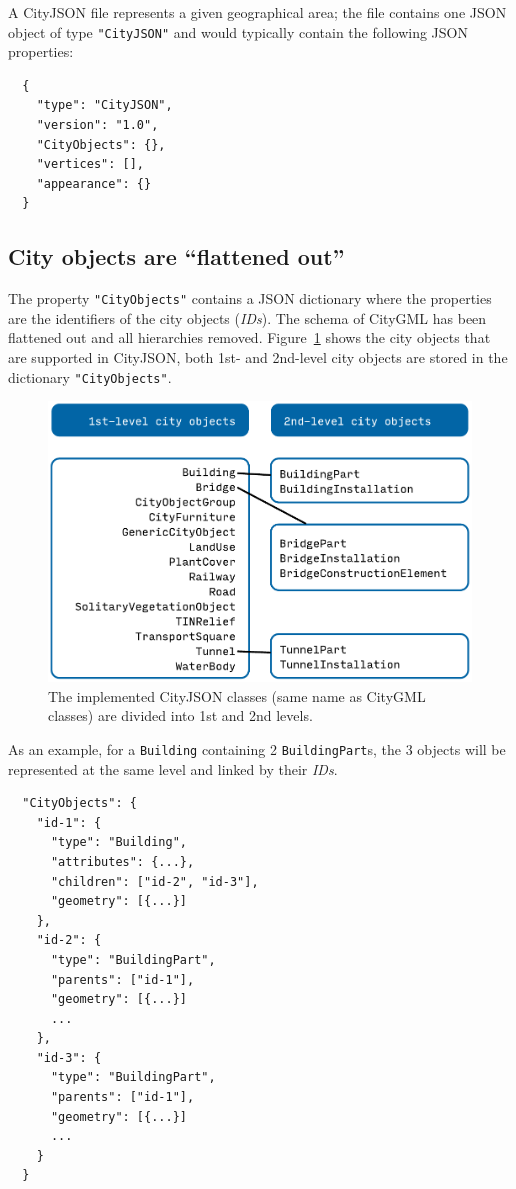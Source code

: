 %

A CityJSON file represents a given geographical area; the file contains one JSON object of type \texttt{"CityJSON"} and would typically contain the following JSON properties:
\begin{lstlisting}
  {
    "type": "CityJSON",
    "version": "1.0",
    "CityObjects": {},
    "vertices": [],
    "appearance": {}
  }
\end{lstlisting}


\subsection{City objects are ``flattened out''}

The property \texttt{"CityObjects"} contains a JSON dictionary where the properties are the identifiers of the city objects (\emph{IDs}).
The schema of CityGML has been flattened out and all hierarchies removed.
Figure~\ref{fig:cityjson_co} shows the city objects that are supported in CityJSON, both 1st- and 2nd-level city objects are stored in the dictionary \texttt{"CityObjects"}.
\begin{figure}
  \centering
  \includegraphics[width=0.6\linewidth]{figs/cityjson_co}
  \caption{The implemented CityJSON classes (same name as CityGML classes) are divided into 1st and 2nd levels.}
\label{fig:cityjson_co}
\end{figure}

%

As an example, for a \texttt{Building} containing 2 \texttt{BuildingPart}s, the 3 objects will be represented at the same level and linked by their \emph{IDs}.
\begin{lstlisting}
  "CityObjects": {
    "id-1": {
      "type": "Building",
      "attributes": {...},
      "children": ["id-2", "id-3"],
      "geometry": [{...}]
    },
    "id-2": {
      "type": "BuildingPart",
      "parents": ["id-1"],
      "geometry": [{...}]
      ...
    },
    "id-3": {
      "type": "BuildingPart",
      "parents": ["id-1"],
      "geometry": [{...}]
      ...
    }
  }
\end{lstlisting}


